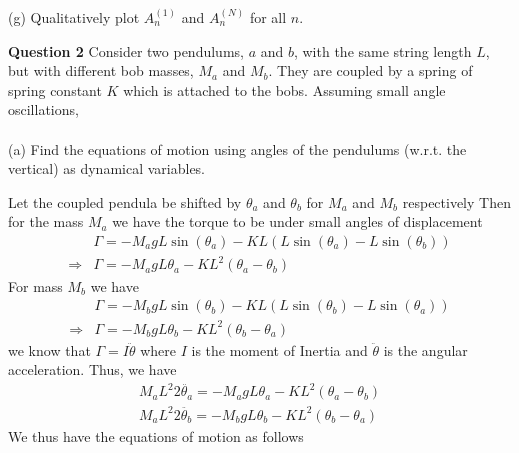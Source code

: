 \documentclass[addpoints]{exam}
\begin{document}
\begin{questions}
\begin{solution}
\end{solution}
(g) Qualitatively plot $A^{(1)}_n$ and $A^{(N)}_n$ for all $n$.
\begin{solution}
 
\end{solution}

\question\textbf{Question 2}
Consider two pendulums, $a$ and $b$, with the same string length $L$, but with different bob masses, $M_a$ and $M_b$. They are coupled by a spring of spring constant $K$ which 
is attached to the bobs. Assuming small angle oscillations, \\ \\ 
(a) Find the equations of motion using angles of the pendulums (w.r.t. the vertical) as dynamical variables.
\begin{solution}
    Let the coupled pendula be shifted by $\theta_a$ and $\theta_b$ for $M_a$ and $M_b$ respectively
    Then for the mass $M_a$ we have the torque to be under small angles of displacement 
    \begin{align*}
        &\Gamma = -M_a g L\sin(\theta_a) - KL(L\sin(\theta_a)-L\sin(\theta_b))\\ 
        \Rightarrow&\Gamma = -M_a g L\theta_a - KL^2(\theta_a-\theta_b) 
    \end{align*}
    For mass $M_b$ we have 
    \begin{align*}
        &\Gamma = -M_b g L\sin(\theta_b) - KL(L\sin(\theta_b)-L\sin(\theta_a))\\ 
        \Rightarrow&\Gamma = -M_b g L\theta_b - KL^2(\theta_b-\theta_a) 
    \end{align*}
    we know that $\Gamma = I\ddot{\theta}$ where $I$ is the moment of Inertia and $\ddot{\theta}$ is the angular acceleration. Thus, we have 
    \begin{align*}
        M_a{L^2}{2} \ddot{\theta_a} =   -M_a g L\theta_a - KL^2(\theta_a-\theta_b)\\ 
        M_a{L^2}{2} \ddot{\theta_b} =  -M_b g L\theta_b - KL^2(\theta_b-\theta_a) 
    \end{align*}
    We thus have the equations of motion as follows\\
    \begin{center}
        \\ 
    \end{center}
\end{solution}

\end{questions}
\end{document}
